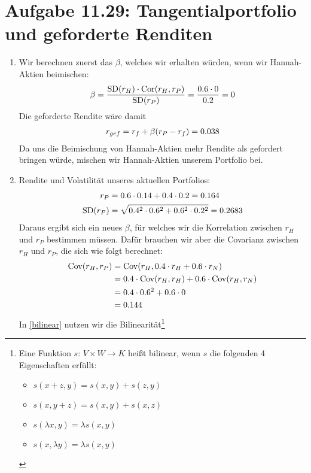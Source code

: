 \documentclass{article}
\DeclareMathOperator{\Cov}{Cov}
\DeclareMathOperator{\SD}{SD}
\DeclareMathOperator{\Cor}{Cor}
\begin{document}
	\section*{Aufgabe 11.29: Tangentialportfolio und geforderte Renditen}
	\begin{enumerate}[label=(\alph*)]
		\item Wir berechnen zuerst das $\beta$, welches wir erhalten würden, wenn wir Hannah-Aktien beimischen:
		\begin{align}
			\beta = \frac{\SD(r_H)\cdot\Cor(r_H,r_P)}{\SD(r_P)} = \frac{0.6\cdot 0}{0.2} = 0 \notag
		\end{align}
		Die geforderte Rendite wäre damit
		\begin{align}
			r_{gef} = r_f + \beta(r_P - r_f) = 0.038 \notag
		\end{align}
		Da uns die Beimischung von Hannah-Aktien mehr Rendite als gefordert bringen würde, mischen wir Hannah-Aktien unserem Portfolio bei.
		\item Rendite und Volatilität unseres aktuellen Portfolios:
		\begin{align}
			r_P &= 0.6\cdot 0.14 + 0.4\cdot 0.2 = 0.164 \notag \\
			\SD(r_P) &= \sqrt{0.4^2\cdot 0.6^2 + 0.6^2\cdot 0.2^2} = 0.2683 \notag
		\end{align}
		Daraus ergibt sich ein neues $\beta$, für welches wir die Korrelation zwischen $r_H$ und $r_P$ bestimmen müssen. Dafür brauchen wir aber die Covarianz zwischen $r_H$ und $r_P$, die sich wie folgt berechnet:
		\begin{align}
			\label{bilinear}
			\Cov(r_H, r_P) &= \Cov(r_H, 0.4\cdot r_H + 0.6\cdot r_N) \notag \\
			&= 0.4\cdot \Cov(r_H,r_H) + 0.6\cdot \Cov(r_H,r_N) \\
			&= 0.4\cdot 0.6^2 + 0.6\cdot 0 \notag \\
			&= 0.144 \notag
		\end{align}
		In \eqref{bilinear} nutzen wir die Bilinearität\footnote{Eine Funktion $s$: $V\times W\to K$ heißt bilinear, wenn $s$ die folgenden 4 Eigenschaften erfüllt:
		\begin{itemize}
			\item $s(x+z,y) = s(x,y) + s(z,y)$
			\item $s(x,y+z) = s(x,y) + s(x,z)$
			\item $s(\lambda x,y) = \lambda s(x,y)$
			\item $s(x,\lambda y) = \lambda s(x,y)$
		\end{itemize}
}
\end{enumerate}
\end{document}
